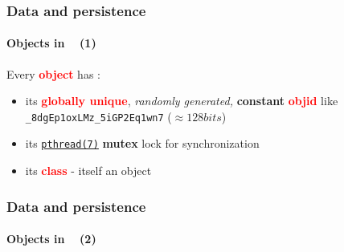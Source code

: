 \documentclass[xcolor=svgnames,final,smaller,a4]{beamer}
\begin{document}
\begin{frame}
    \frametitle{Data and persistence}
    \framesubtitle{Objects in \Bismon ~ (1)}

    Every \textcolor{red}{\textbf{object}} has : 
    \begin{itemize}
    \item its \textcolor{red}{\textbf{globally unique}}, \textit{randomly generated,}  \textbf{constant} \textcolor{red}{\textbf{objid}} like \texttt{\_8dgEp1oxLMz\_5iGP2Eq1wn7} ($\approx 128 bits$)
    \item its {\href{http://man7.org/linux/man-pages/man7/pthreads.7.html}{\texttt{pthread(7)}}} \textbf{mutex} lock for synchronization
    \item its {\textcolor{red}{\textbf{class}}} - itself an object
    \end{itemize}
    
\end{frame}


\begin{frame}
    \frametitle{Data and persistence}
    \framesubtitle{Objects in \Bismon ~ (2)}
\end{frame}
\end{document}
